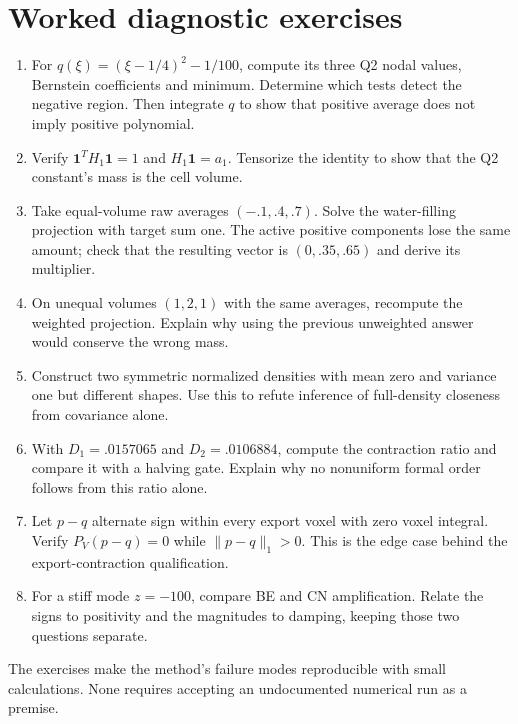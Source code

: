 \section{Worked diagnostic exercises}
\begin{enumerate}
\item For $q(\xi)=(\xi-1/4)^2-1/100$, compute its three Q2 nodal values, Bernstein coefficients and minimum. Determine which tests detect the negative region. Then integrate $q$ to show that positive average does not imply positive polynomial.
\item Verify $\mathbf1^TH_1\mathbf1=1$ and $H_1\mathbf1=a_1$. Tensorize the identity to show that the Q2 constant's mass is the cell volume.
\item Take equal-volume raw averages $(-.1,.4,.7)$. Solve the water-filling projection with target sum one. The active positive components lose the same amount; check that the resulting vector is $(0,.35,.65)$ and derive its multiplier.
\item On unequal volumes $(1,2,1)$ with the same averages, recompute the weighted projection. Explain why using the previous unweighted answer would conserve the wrong mass.
\item Construct two symmetric normalized densities with mean zero and variance one but different shapes. Use this to refute inference of full-density closeness from covariance alone.
\item With $D_1=.0157065$ and $D_2=.0106884$, compute the contraction ratio and compare it with a halving gate. Explain why no nonuniform formal order follows from this ratio alone.
\item Let $p-q$ alternate sign within every export voxel with zero voxel integral. Verify $P_V(p-q)=0$ while $\|p-q\|_1>0$. This is the edge case behind the export-contraction qualification.
\item For a stiff mode $z=-100$, compare BE and CN amplification. Relate the signs to positivity and the magnitudes to damping, keeping those two questions separate.
\end{enumerate}
The exercises make the method's failure modes reproducible with small calculations. None requires accepting an undocumented numerical run as a premise.
